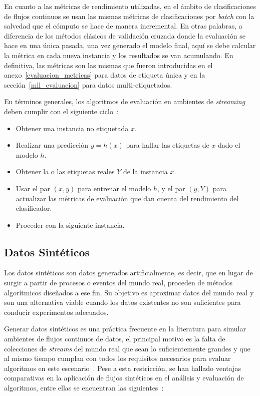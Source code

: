 En cuanto a las métricas de rendimiento utilizadas, en el ámbito de
clasificaciones de flujos continuos se usan las mismas métricas de
clasificaciones por \textit{batch} con la salvedad que el cómputo se hace de
manera incremental. En otras palabras, a diferencia de los métodos clásicos de
validación cruzada donde la evaluación se hace en una única pasada, una vez
generado el modelo final, aquí se debe calcular la métrica en cada nueva
instancia y los resultados se van acumulando. En definitiva, las métricas son
las mismas que fueron introducidas en el anexo~\ref{evaluacion_metricas} para
datos de etiqueta única y en la sección~\ref{mll_evaluacion} para datos
multi-etiquetados.

En términos generales, los algoritmos de evaluación en ambientes de
\textit{streaming} deben cumplir con el siguiente
ciclo~\cite{bifet_machine_2018}:

\begin{itemize}

	\item Obtener una instancia no etiquetada $x$.

	\item Realizar una predicción $y = h(x)$ para hallar las etiquetas de $x$
	      dado el modelo $h$.

	\item Obtener la o las etiquetas reales $Y$ de la instancia $x$.

	\item Usar el par $(x,y)$ para entrenar el modelo $h$, y el par $(y,Y)$ para
	      actualizar las métricas de evaluación que dan cuenta del rendimiento del
	      clasificador.

	\item Proceder con la siguiente instancia.

\end{itemize}

\subsection{Datos Sintéticos}
\label{stream_syn}

Los datos sintéticos son datos generados artificialmente, es decir, que en
lugar de surgir a partir de procesos o eventos del mundo real, proceden de
métodos algorítmicos diseñados a ese fin. Su objetivo es aproximar datos del
mundo real y son una alternativa viable cuando los datos existentes no son
suficientes para conducir experimentos adecuados.

Generar datos sintéticos es una práctica frecuente en la literatura para simular
ambientes de flujos continuos de datos, el principal motivo es la falta de
colecciones de \textit{streams} del mundo real que sean lo suficientemente
grandes y que al mismo tiempo cumplan con todos los requisitos necesarios para
evaluar algoritmos en este escenario~\cite{kirkby_improving_2007}. Pese a esta
restricción, se han hallado ventajas comparativas en la aplicación de flujos
sintéticos en el análisis y evaluación de algoritmos, entre ellas se encuentran
las siguientes~\cite{read_generating_2009}:

